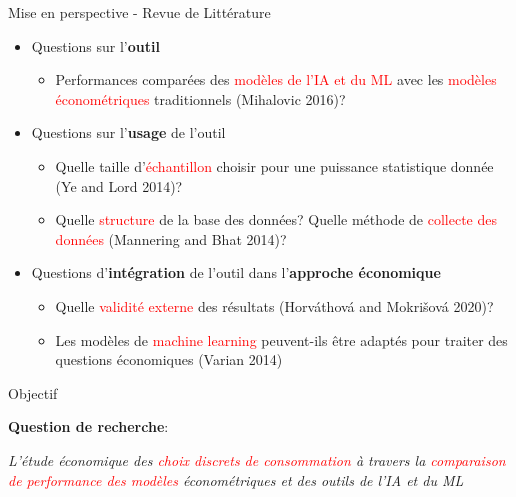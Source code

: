 \documentclass[11pt,ignorenonframetext,]{beamer}
\providecommand{\tightlist}{%
  \setlength{\itemsep}{0pt}\setlength{\parskip}{0pt}}
\begin{document}
\begin{frame}{Mise en perspective - Revue de Littérature}
\protect\hypertarget{mise-en-perspective---revue-de-litterature}{}

\begin{itemize}
\tightlist
\item
  Questions sur l'\textbf{outil}

  \begin{itemize}
  \tightlist
  \item
    Performances comparées des \textcolor{red}{modèles de l'IA et du ML}
    avec les \textcolor{red}{modèles économétriques} traditionnels
    (Mihalovic 2016)?
  \end{itemize}
\item
  Questions sur l'\textbf{usage} de l'outil

  \begin{itemize}
  \tightlist
  \item
    Quelle taille d'\textcolor{red}{échantillon} choisir pour une
    puissance statistique donnée (Ye and Lord 2014)?
  \item
    Quelle \textcolor{red}{structure} de la base des données? Quelle
    méthode de \textcolor{red}{collecte des données} (Mannering and Bhat
    2014)?
  \end{itemize}
\item
  Questions d'\textbf{intégration} de l'outil dans l'\textbf{approche
  économique}

  \begin{itemize}
  \tightlist
  \item
    Quelle \textcolor{red}{validité externe} des résultats (Horváthová
    and Mokrišová 2020)?
  \item
    Les modèles de \textcolor{red}{machine learning} peuvent-ils être
    adaptés pour traiter des questions économiques (Varian 2014)
  \end{itemize}
\end{itemize}

\end{frame}

\begin{frame}{Objectif}
\protect\hypertarget{objectif}{}

\textbf{Question de recherche}:

\begin{center}
\Large 
\textit{L'étude économique des \textcolor{red}{choix discrets de consommation} à travers la \textcolor{red}{comparaison de performance des modèles} économétriques et des outils de l'IA et du ML}
\normalsize
\end{center}

\end{frame}
\end{document}
